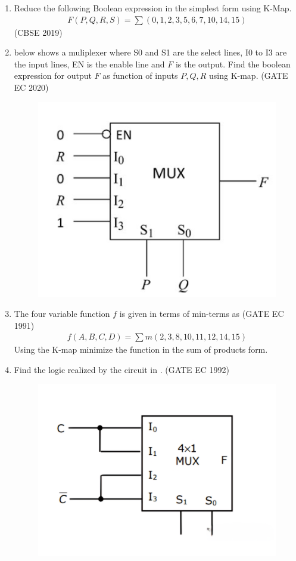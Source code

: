 \begin{enumerate}[label=\arabic*.,ref=\theenumi]
\item 
	Reduce the following Boolean expression in the simplest form using K-Map.
		\begin{align*}
F(P,Q,R,S) = \sum (0,1,2,3,5,6,7,10,14,15)
		\end{align*}
\hfill (CBSE 2019)
\label{prob:2019/c/6/d}
%
\item {} below shows a muliplexer where S0 and S1 are the select lines, I0 to I3 are the input lines, EN is the enable line and $F$ is the output. Find the boolean expression for output $F$ as function of inputs $P,Q,R$ using K-map. 
\hfill (GATE EC 2020)
%
\label{prob:2020/gate/ec/10}
\begin{figure}[H]
\centering
	\includegraphics[width=0.5\columnwidth]{figs/2020-gate-ec-10.png}
\caption{}
\label{fig:2020/gate/ec/10}
\end{figure}
%
\item
	The four variable function $f$ is given in terms of min-terms as
\hfill (GATE EC 1991)
		\begin{align*}
	    f(A,B,C,D) = \sum m(2,3,8,10,11,12,14,15)
		\end{align*}
	    Using the K-map minimize the function in the sum of products form. 
\label{prob:1991/gate/ec/9}
\item Find the logic realized by the circuit in  
.
\hfill (GATE EC 1992)
\label{prob:1992/gate/ec/1/22}
\begin{figure}[H]
\centering
	\includegraphics[width=0.5\columnwidth]{figs/1992-gate-ec-1-22.png}

\end{figure}
\end{enumerate}
